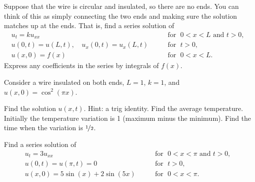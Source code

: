 \begin{exercise}[challenging]
Suppose that the wire is circular and insulated, so there are no ends. 
You can think of this as simply connecting the two ends and 
making sure the solution matches up at the ends.
That is, find a series solution of
\begin{equation*}
\begin{array}{ll}
u_t = k u_{xx} & \qquad \text{for } \; 0 < x < L \text{ and } t > 0, \\
u(0,t) = u(L,t) , \quad
u_x(0,t) = u_x(L,t)  & \qquad \text{for } \; t > 0, \\
u(x,0) = f(x) & \qquad \text{for } \; 0 < x < L .
\end{array}
\end{equation*}
Express any coefficients in the series by integrals of $f(x)$.
\end{exercise}

\begin{exercise}
Consider a wire insulated on both ends, $L=1$, $k=1$,
and $u(x,0) = \cos^2(\pi x)$.
\begin{tasks}
\task
Find the solution $u(x,t)$.  Hint: a trig identity.
\task
Find the average temperature.
\task
Initially the temperature variation is 1 (maximum minus the minimum).
Find the time when the variation is $\nicefrac{1}{2}$.
\end{tasks}
\end{exercise}

\setcounter{exercise}{100}


\begin{exercise}
Find a series solution of
\begin{equation*}
\begin{array}{ll}
u_t =  3 u_{xx} & \qquad \text{for } \; 0 < x < \pi \text{ and } t > 0, \\
u(0,t) = u(\pi,t) = 0 & \qquad \text{for } \; t > 0, \\
u(x,0) = 5\sin (x) + 2\sin (5x) & \qquad \text{for } \; 0 < x < \pi .
\end{array}
\end{equation*}
\end{exercise}


